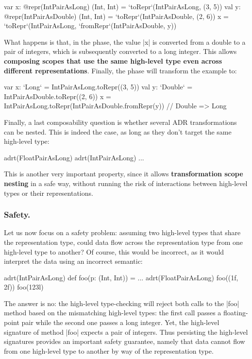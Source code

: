 \begin{lstlisting-nobreak}
var x: @repr(IntPairAsLong) (Int, Int) = `toRepr`(IntPairAsLong, (3, 5))
val y: @repr(IntPairAsDouble) (Int, Int) = `toRepr`(IntPairAsDouble, (2, 6))
x = `toRepr`(IntPairAsLong, `fromRepr`(IntPairAsDouble, y))
\end{lstlisting-nobreak}

What happens is that, in the \coerce{} phase, the value |x| is converted from a double to a pair of integers, which is subsequently converted to a long integer. This allows \textbf{composing scopes that use the same high-level type even across different representations}. Finally, the \commit{} phase will transform the example to:

\begin{lstlisting-nobreak}
var x: `Long` = IntPairAsLong.toRepr((3, 5))
val y: `Double` = IntPairAsDouble.toRepr((2, 6))
x = IntPairAsLong.toRepr(IntPairAsDouble.fromRepr(y)) // Double => Long
\end{lstlisting-nobreak}

Finally, a last composability question is whether several ADR transformations can be nested. This is indeed the case, as long as they don't target the same high-level type:

\begin{lstlisting-nobreak}
adrt(FloatPairAsLong) {
  adrt(IntPairAsLong) {
    ...
  }
}
\end{lstlisting-nobreak}

This is another very important property, since it allows \textbf{transformation scope nesting} in a safe way, without running the risk of interactions between high-level types or their representations.

\subsubsection{Safety.} Let us now focus on a safety problem: assuming two high-level types that share the representation type, could data flow across the representation type from one high-level type to another? Of course, this would be incorrect, as it would interpret the data using an incorrect semantic:

\begin{lstlisting-nobreak}
adrt(IntPairAsLong) { def foo(p: (Int, Int)) = ... }
adrt(FloatPairAsLong) { foo((1f, 2f)) }
foo(123l)
\end{lstlisting-nobreak}

The answer is no: the high-level type-checking will reject both calls to the |foo| method based on the mismatching high-level types: the first call passes a floating-point pair while the second one passes a long integer. Yet, the high-level signature of method |foo| expects a pair of integers. Thus persisting the high-level signatures provides an important safety guarantee, namely that data cannot flow from one high-level type to another by way of the representation type.





